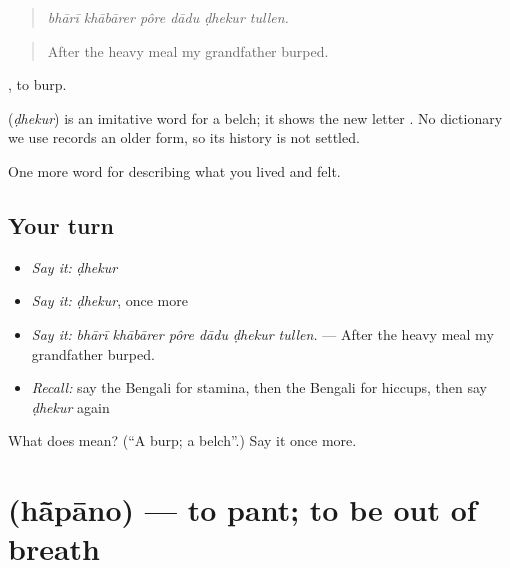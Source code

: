 \begin{quote}
     
\end{quote}

\begin{quote}
\emph{bhārī khābārer pôre dādu ḍhekur tullen.}
\end{quote}

\begin{quote}
After the heavy meal my grandfather burped.
\end{quote}

 , to burp.

\begin{cousinweb}
\textbf{} (\emph{ḍhekur}) is an imitative word for a belch; it shows the new letter . No dictionary we use records an older form, so its history is not settled.
\end{cousinweb}

\begin{grammarlens}[title={What you've built}]
One more word for describing what you lived and felt.
\end{grammarlens}

\subsection*{Your turn}
\begin{itemize}
\raggedright
  \item \emph{Say it:} \emph{ḍhekur}
  \item \emph{Say it:} \emph{ḍhekur}, once more
  \item \emph{Say it:} \emph{bhārī khābārer pôre dādu ḍhekur tullen.} — After the heavy meal my grandfather burped.
  \item \emph{Recall:} say the Bengali for stamina, then the Bengali for hiccups, then say \emph{ḍhekur} again
\end{itemize}

\begin{tcolorbox}[breakable,colback=teal!4,colframe=teal!35!black,title={Before you move on}]
What does  mean? (\textquotedblleft{}A burp; a belch\textquotedblright{}.) Say it once more.
\end{tcolorbox}
\section[\texorpdfstring{\bn{হাঁপানো} (hā̃pāno)}{হাঁপানো (hā̃pāno)}]{ (hā̃pāno) — to pant; to be out of breath}

